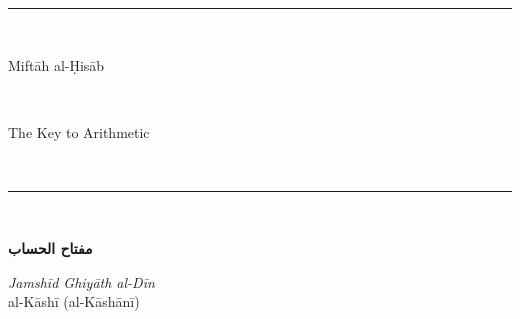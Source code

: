 \documentclass[11pt,a4paper]{article}
\newenvironment{arabicbox}{%

  \begin{framed}

  \begin{minipage}{\linewidth-2\fboxsep-2\fboxrule}

  \setlength{\parindent}{0pt}

  \linespread{1.3}\selectfont

}{%

  \end{minipage}

  \end{framed}

}
\newcommand{\longline}{\noindent\rule{\textwidth}{0.4pt}}
\newcommand{\ar}[1]{{\arabicfont\beginR #1\endR}}
\begin{document}



\thispagestyle{empty}

\begin{center}

\vspace*{1.5cm}



{\fontsize{14}{16}\selectfont\ar{بسم الله الرحمن الرحيم}}\\[0.8cm]



{\color{rulecolor}\longline}\\[0.6cm]



{\fontsize{28}{34}\selectfont\bfseries\color{titlecolor}

Mift\=ah al-\d{H}is\=ab}\\[0.5cm]

{\fontsize{18}{22}\selectfont\color{sectioncolor}

The Key to Arithmetic}\\[0.3cm]

{\color{rulecolor}\longline}\\[1cm]



\begin{arabicbox}

\begin{center}

\begin{Arabic}

{\Large\textbf{مفتاح الحساب}}

\end{Arabic}

\end{center}

\end{arabicbox}



\vspace{0.8cm}



{\Large\textit{Jamsh\=id Ghiy\=ath al-D\=in}}\\[0.3cm]

{\large al-K\=ash\=i (al-K\=ash\=an\=i)}\\[0.2cm]


\end{center}
\end{document}
